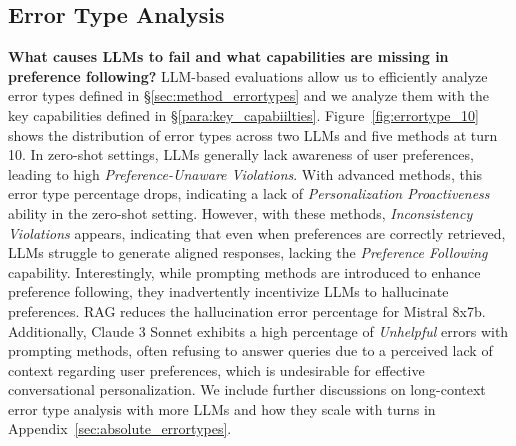 \subsection{Error Type Analysis}
\label{sec: errortype}
\textbf{What causes LLMs to fail and what capabilities are missing in preference following?} LLM-based evaluations allow us to efficiently analyze error types defined in \S\ref{sec:method_errortypes} and we analyze them with the key capabilities defined in \S\ref{para:key_capabiilties}. Figure~\ref{fig:errortype_10} shows the distribution of error types across two LLMs and five methods at turn 10. In zero-shot settings, LLMs generally lack awareness of user preferences, leading to high \textit{Preference-Unaware Violations}. With advanced methods, this error type percentage drops, indicating a lack of \textit{Personalization Proactiveness} ability in the zero-shot setting. However, with these methods, \textit{Inconsistency Violations} appears, indicating that even when preferences are correctly retrieved, LLMs struggle to generate aligned responses, lacking the \textit{Preference Following} capability.
Interestingly, while prompting methods are introduced to enhance preference following, they inadvertently incentivize LLMs to hallucinate preferences. RAG reduces the hallucination error percentage for Mistral 8x7b. Additionally, Claude 3 Sonnet exhibits a high percentage of \textit{Unhelpful} errors with prompting methods, often refusing to answer queries due to a perceived lack of context regarding user preferences, which is undesirable for effective conversational personalization.
We include further discussions on long-context error type analysis with more LLMs and how they scale with turns in Appendix~\ref{sec:absolute_errortypes}.
